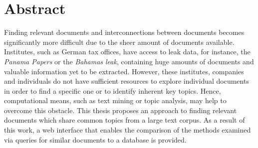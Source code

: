 \chapter*{Abstract}

Finding relevant documents and interconnections between documents becomes significantly more difficult due to the sheer amount of documents available.
Institutes, such as German tax offices, have access to leak data, for instance, the \textit{Panama Papers} or the \textit{Bahamas leak}, 
containing huge amounts of documents and valuable information yet to be extracted.
However, these institutes, companies and individuals do not have sufficient resources to explore individual documents 
in order to find a specific one or to identify inherent key topics.
Hence, computational means, such as text mining or topic analysis, may help to overcome this obstacle.
This thesis proposes an approach to finding relevant documents which share common topics from a large text corpus.
As a result of this work, a web interface that enables the comparison of the methods examined via queries for similar documents to a database is provided. 